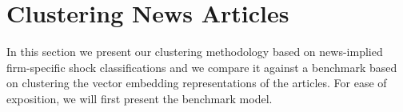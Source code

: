 \section{Clustering News Articles}

\hspace{0.5cm}In this section we present our clustering methodology based on news-implied firm-specific shock classifications and we compare it against a benchmark based on clustering the vector embedding representations of the articles. For ease of exposition, we will first present the benchmark model.







